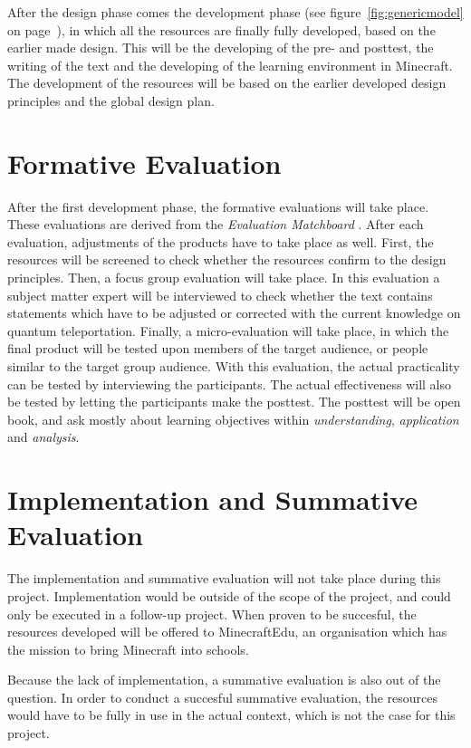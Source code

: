 \documentclass[12pt]{report} %
\begin{document}
After the design phase comes the development phase \cite{genericmodel} (see figure~\ref{fig:genericmodel} on page~\pageref{fig:genericmodel}), in which all the resources are finally fully developed, based on the earlier made design. This will be the developing of the pre- and posttest, the writing of the text and the developing of the learning environment in Minecraft. The development of the resources will be based on the earlier developed design principles and the global design plan.

\section{Formative Evaluation}

After the first development phase, the formative evaluations will take place. These evaluations are derived from the \emph{Evaluation Matchboard} \cite{evamatchboard}. After each evaluation, adjustments of the products have to take place as well. First, the resources will be screened to check whether the resources confirm to the design principles. Then, a focus group evaluation will take place. In this evaluation a subject matter expert will be interviewed to check whether the text contains statements which have to be adjusted or corrected with the current knowledge on quantum teleportation. Finally, a micro-evaluation will take place, in which the final product will be tested upon members of the target audience, or people similar to the target group audience. With this evaluation, the actual practicality can be tested by interviewing the participants. The actual effectiveness will also be tested by letting the participants make the posttest. The posttest will be open book, and ask mostly about learning objectives within \emph{understanding}, \emph{application} and \emph{analysis}.

\section{Implementation and Summative Evaluation}

The implementation and summative evaluation will not take place during this project. Implementation would be outside of the scope of the project, and could only be executed in a follow-up project. When proven to be succesful, the resources developed will be offered to MinecraftEdu, an organisation which has the mission to bring Minecraft into schools.

Because the lack of implementation, a summative evaluation is also out of the question. In order to conduct a succesful summative evaluation, the resources would have to be fully in use in the actual context, which is not the case for this project.
\end{document}
